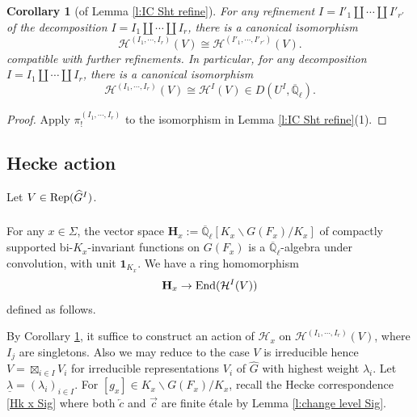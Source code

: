 \documentclass[11pt]{amsart}
\numberwithin{equation}{section}
\theoremstyle{plain}
\newtheorem{cor}[subsubsection]{Corollary}
\theoremstyle{definition}
\def\QQ{\mathbb{Q}}
\newcommand\cH{\mathcal{H}}
\def\bH{\mathbf{H}}
\def\dG{\widehat{G}}
\newcommand\Rep{\textup{Rep}}
\newcommand\End{\textup{End}}
\newcommand{\Qlbar}{\overline{\QQ}_\ell}
\newcommand\un{\underline}
\newcommand{\bs}{\backslash}
\newcommand\sss{\subsubsection}
\newcommand\one{\mathbf{1}}
\newcommand{\oll}[1]{\overleftarrow{#1}}
\newcommand{\orr}[1]{\overrightarrow{#1}}
\newcommand{\Sig}{\Sigma}
\renewcommand{\l}{\lambda}
\begin{document}
\begin{cor}[of Lemma \ref{l:IC Sht refine}]\label{c:same HV}
For any refinement $I=I'_{1}\coprod\cdots \coprod I'_{r'}$  of the decomposition  $I=I_{1}\coprod\cdots \coprod I_{r}$, there is a canonical isomorphism
\begin{equation*}
\cH^{(I_{1},\cdots, I_{r})}(V)\cong \cH^{(I'_{1},\cdots, I'_{r'})}(V).
\end{equation*}
compatible with further refinements. In particular, for any decomposition  $I=I_{1}\coprod\cdots \coprod I_{r}$, there is a canonical isomorphism
\begin{equation*}
\cH^{(I_{1},\cdots ,I_{r})}(V)\cong\cH^{I}(V)\in D(U^{I}, \Qlbar).
\end{equation*}
\end{cor}
\begin{proof} 
Apply $\pi^{(I_{1},\cdots, I_{r})}_{!}$ to the isomorphism in Lemma \ref{l:IC Sht refine}(1).
\end{proof}







\subsection{Hecke action}

Let $V\in \Rep(\dG^{I})$. 


\sss{} For any $x\in \Sig$, the vector space $\bH_{x}:=\Qlbar[K_{x}\bs G(F_{x})/K_{x}]$ of compactly supported bi-$K_{x}$-invariant functions on $G(F_{x})$ is a $\Qlbar$-algebra under convolution, with unit $\one_{K_{x}}$. We have a ring homomorphism
\begin{equation*}
\bH_{x}\to \End(\cH^{I}(V))
\end{equation*}
defined as follows. 

By Corollary \ref{c:same HV}, it suffice to construct an action of $\cH_{x}$ on $\cH^{(I_{1},\cdots, I_{r})}(V)$, where $I_{j}$ are singletons. Also we may reduce to the case $V$ is irreducible hence $V=\boxtimes_{i\in I}V_{i}$ for irreducible representations $V_{i}$ of $\dG$ with highest weight $\l_{i}$. Let $\un\l=(\l_{i})_{i\in I}$. For $[g_{x}]\in K_{x}\bs G(F_{x})/K_{x}$, recall the Hecke correspondence \eqref{Hk x Sig} where both $\oll{c}$ and $\orr{c}$ are finite \'etale by Lemma \ref{l:change level Sig}. 
\end{document}
